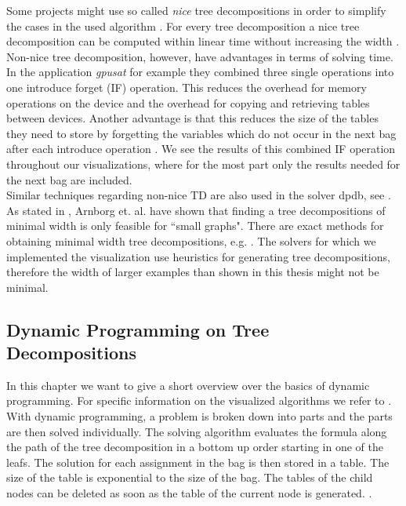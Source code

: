\documentclass[a4paper, 12pt, bibliography=totoc]{scrartcl}
\begin{document}
\medskip\noindent
Some projects might use so called \textit{nice} tree decompositions in order to simplify the cases in the used algorithm \cite[Ch.~2.2]{DiplomarbeitZisser}.
For every tree decomposition a nice tree decomposition can be computed within linear time without increasing the width \cite{klokstw}.
Non-nice tree decomposition, however, have advantages in terms of solving time. In the application \textit{gpusat} for example they combined three single operations into one introduce forget (IF) operation. This reduces the overhead for memory operations on the device and the overhead for copying and retrieving tables between devices. Another advantage is that this reduces the size of the tables they need to store by forgetting the variables which do not occur in the next bag after each introduce operation \cite[Ch.~4.2.1]{DiplomarbeitZisser}. 
We see the results of this combined IF operation throughout our visualizations, where for the most part only the results needed for the next bag are included.\\
Similar techniques regarding non-nice TD are also used in the solver dpdb, see \cite[Ch.~4.1]{dpdbpadl2020}.\\

As stated in \cite[Ch.~2.2]{DiplomarbeitZisser}, Arnborg et. al. \cite{arnborgtd} have shown that finding a tree decompositions of minimal width is only feasible for ``small graphs".  There are exact methods for obtaining minimal width tree decompositions,  e.g. \cite{gogatetw, bachoore06}. The solvers for which we implemented the visualization use heuristics  for  generating tree decompositions, therefore  the width of larger examples than shown in this thesis might not be minimal. 


\subsection{Dynamic Programming on Tree Decompositions}
In this chapter we want to give a short overview over the basics of dynamic programming. For specific information on the visualized algorithms we refer to \cite{DiplomarbeitZisser, samermodelcounting, dpdbpadl2020}. \\

With dynamic programming, a problem is broken down into parts and the parts are then solved individually. The solving algorithm evaluates the formula along the path of the tree decomposition in a bottom up order starting in one of the leafs. The solution for each assignment in the bag is then stored in a table. The size of the table is exponential to the size of the bag. The tables of the child nodes can be deleted as soon as the table of the current node is generated. \cite[Ch. 3.1]{DiplomarbeitZisser}.\\
\end{document}

